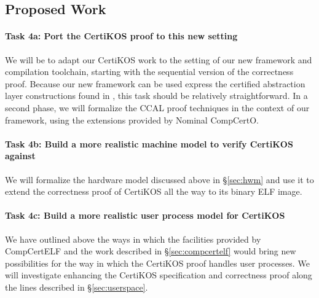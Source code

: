 \subsection{Proposed Work}

\paragraph*{Task 4a: Port the CertiKOS proof to this new setting}

We will be to adapt our CertiKOS work
to the setting of our new framework and compilation toolchain,
starting with the sequential version of the correctness proof.
Because our new framework can be used express
the certified abstraction layer constructions found in \cite{dscal15},
this task should be relatively straightforward.
In a second phase,
we will formalize the CCAL proof techniques \cite{ccal18}
in the context of our framework,
using the extensions provided by Nominal CompCertO.

\vspace*{-2ex}
\paragraph*{Task 4b: Build a more realistic machine model to verify CertiKOS against}

We will formalize the hardware model discussed above in \S\ref{sec:hwm}
and use it to extend the correctness proof of CertiKOS
all the way to its binary ELF image.

\vspace*{-2ex}
\paragraph*{Task 4c: Build a more realistic user process model for CertiKOS}

We have outlined above the ways in which
the facilities provided by CompCertELF and the work described in
\S\ref{sec:compcertelf}
would bring new possibilities for the way in which
the CertiKOS proof handles user processes.
We will investigate
enhancing the CertiKOS specification and correctness proof
along the lines described in \S\ref{sec:userspace}.


